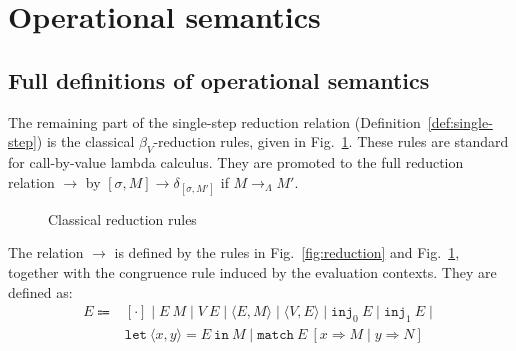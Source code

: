 \section{Operational semantics}
\subsection{Full definitions of operational semantics} \label{sec:opsem-full}
The remaining part of the single-step reduction relation (Definition~\ref{def:single-step}) is the classical $\beta_V$-reduction rules, given in Fig.~\ref{fig:reduction-beta}.
These rules are standard for call-by-value lambda calculus.
They are promoted to the full reduction relation $\longrightarrow$ by
$[\sigma, M] \longrightarrow \delta_{[\sigma, M']}$ if $M \longrightarrow_\Lambda M'$.
\begin{figure}[ht]
  \caption{Classical reduction rules}
  \label{fig:reduction-beta}
\end{figure}

The relation $\longrightarrow$ is defined by the rules in Fig.~\ref{fig:reduction} and Fig.~\ref{fig:reduction-beta}, together with the congruence rule induced by the evaluation contexts.
They are defined as:
\begin{equation*}
  \begin{array}{rl}
    E \Coloneqq & [\cdot]\mid E\ M\mid V\ E\mid\langle E, M\rangle\mid\langle V,E\rangle\mid\texttt{inj}_0\ E\mid\texttt{inj}_1\ E\mid \\
                & \texttt{let}\ \langle x,y\rangle=E\ \texttt{in}\ M\mid\texttt{match}\ E\ [x\Rightarrow M\mid y\Rightarrow N ]
  \end{array}
\end{equation*}

